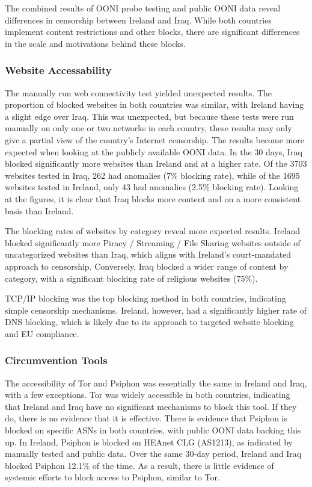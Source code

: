 The combined results of OONI probe testing and public OONI data reveal differences in censorship between Ireland and Iraq. While both countries implement content restrictions and other blocks, there are significant differences in the scale and motivations behind these blocks.

\subsubsection{Website Accessability}

The manually run web connectivity test yielded unexpected results. The proportion of blocked websites in both countries was similar, with Ireland having a slight edge over Iraq. This was unexpected, but because these tests were run manually on only one or two networks in each country, these results may only give a partial view of the country's Internet censorship. The results become more expected when looking at the publicly available OONI data. In the 30 days, Iraq blocked significantly more websites than Ireland and at a higher rate. Of the 3703 websites tested in Iraq, 262 had anomalies (7\% blocking rate), while of the 1695 websites tested in Ireland, only 43 had anomalies (2.5\% blocking rate). Looking at the figures, it is clear that Iraq blocks more content and on a more consistent basis than Ireland.

The blocking rates of websites by category reveal more expected results. Ireland blocked significantly more Piracy / Streaming / File Sharing websites outside of uncategorized websites than Iraq, which aligns with Ireland's court-mandated approach to censorship. Conversely, Iraq blocked a wider range of content by category, with a significant blocking rate of religious websites (75\%).

TCP/IP blocking was the top blocking method in both countries, indicating simple censorship mechanisms. Ireland, however, had a significantly higher rate of DNS blocking, which is likely due to its approach to targeted website blocking and EU compliance.

\subsubsection{Circumvention Tools}

The accessibility of Tor and Psiphon was essentially the same in Ireland and Iraq, with a few exceptions. Tor was widely accessible in both countries, indicating that Ireland and Iraq have no significant mechanisms to block this tool. If they do, there is no evidence that it is effective. There is evidence that Psiphon is blocked on specific ASNs in both countries, with public OONI data backing this up. In Ireland, Psiphon is blocked on HEAnet CLG (AS1213), as indicated by manually tested and public data. Over the same 30-day period, Ireland and Iraq blocked Psiphon 12.1\% of the time. As a result, there is little evidence of systemic efforts to block access to Psiphon, similar to Tor.

